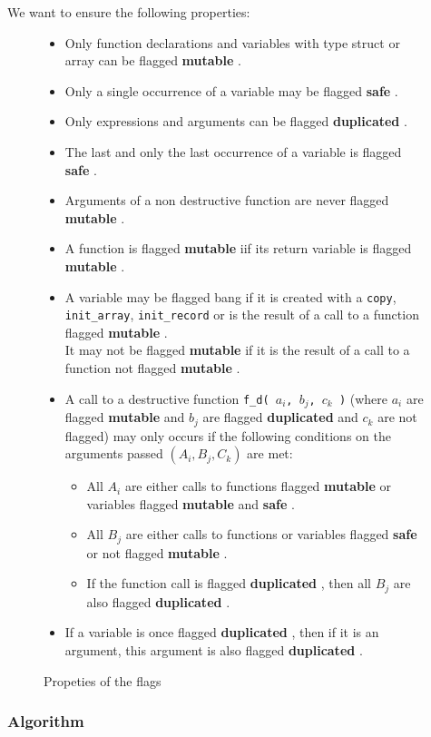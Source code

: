 \documentclass[12pt,a4paper,titlepage]{article}
\newcommand{\cl}[1]{\texttt{#1}}
\newcommand{\bang}{ \textbf{ mutable } }
\newcommand{\safe}{ \textbf{ safe } }
\newcommand{\dupl}{ \textbf{ duplicated } }
\begin{document}
We want to ensure the following properties:

\begin{figure}
\begin{itemize}
\item Only function declarations and variables with type struct or array can be flagged \bang.
\item Only a single occurrence of a variable may be flagged \safe.
\item Only expressions and arguments can be flagged \dupl.
\item The last and only the last occurrence of a variable is flagged \safe.
\item Arguments of a non destructive function are never flagged \bang.
\item A function is flagged \bang iif its return variable is flagged \bang.
\item A variable may be flagged bang if it is created with a \cl{copy}, \cl{init\_array}, \cl{init\_record} or is the result of a call to a function flagged \bang.\\
It may not be flagged \bang if it is the result of a call to a function not flagged \bang.
\item A call to a destructive function \cl{f\_d( $a_i$, $b_j$, $c_k$ )} (where $a_i$ are flagged \bang and $b_j$ are flagged \dupl and $c_k$ are not flagged) may only occurs if the following conditions on the arguments passed $( A_i, B_j, C_k )$ are met:
\begin{itemize}
\item All $A_i$ are either calls to functions flagged \bang or variables flagged \bang and \safe.
\item All $B_j$ are either calls to functions or variables flagged \safe or not flagged \bang.
\item If the function call is flagged \dupl, then all $B_j$ are also flagged \dupl.
\end{itemize}
\item If a variable is once flagged \dupl, then if it is an argument, this argument is also flagged \dupl.
\end{itemize}
\caption{Propeties of the flags}
\label{fig:properties}
\end{figure}



\subsubsection{Algorithm}
\end{document}
